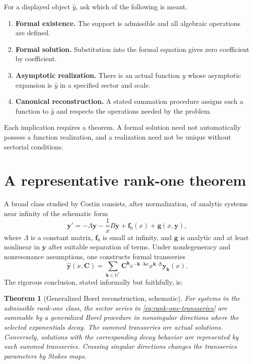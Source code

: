 \documentclass[11pt,openany]{book}
\theoremstyle{definition}
\theoremstyle{plain}
\newtheorem{theorem}{Theorem}[chapter]
\theoremstyle{remark}
\newcommand{\N}{\mathbb{N}}
\newcommand{\trans}[1]{\widehat{#1}}
\begin{document}
For a displayed object $\trans y$, ask which of the following is meant.

\begin{enumerate}
 \item \textbf{Formal existence.} The support is admissible and all algebraic operations are defined.
 \item \textbf{Formal solution.} Substitution into the formal equation gives zero coefficient by coefficient.
 \item \textbf{Asymptotic realization.} There is an actual function $y$ whose asymptotic expansion is $\trans y$ in a specified sector and scale.
 \item \textbf{Canonical reconstruction.} A stated summation procedure assigns such a function to $\trans y$ and respects the operations needed by the problem.
\end{enumerate}
Each implication requires a theorem. A formal solution need not automatically possess a function realization, and a realization need not be unique without sectorial conditions.

\section{A representative rank-one theorem}

A broad class studied by Costin consists, after normalization, of analytic systems near infinity of the schematic form
\begin{equation}\label{eq:rank-one-system}
 \mathbf y'
 =-\Lambda\mathbf y-\frac1xB\mathbf y
 +\mathbf f_0(x)+\mathbf g(x,\mathbf y),
\end{equation}
where $\Lambda$ is a constant matrix, $\mathbf f_0$ is small at infinity, and $\mathbf g$ is analytic and at least nonlinear in $\mathbf y$ after suitable separation of terms. Under nondegeneracy and nonresonance assumptions, one constructs formal transseries
\begin{equation}\label{eq:rank-one-transseries}
 \trans{\mathbf y}(x,\mathbf C)
 =\sum_{\mathbf k\in\N^r}
 \mathbf C^{\mathbf k}e^{-\mathbf k\cdot\boldsymbol\lambda x}
 x^{\mathbf k\cdot\boldsymbol\beta}
 \trans{\mathbf y}_{\mathbf k}(x).
\end{equation}
The rigorous conclusion, stated informally but faithfully, is:

\begin{theorem}[Generalized Borel reconstruction, schematic]\label{thm:costin-schematic}
For systems in the admissible rank-one class, the sector series in \eqref{eq:rank-one-transseries} are summable by a generalized Borel procedure in nonsingular directions where the selected exponentials decay. The summed transseries are actual solutions. Conversely, solutions with the corresponding decay behavior are represented by such summed transseries. Crossing singular directions changes the transseries parameters by Stokes maps.
\end{theorem}
\end{document}
